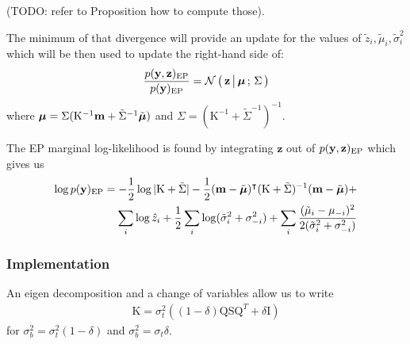  (TODO: refer to Proposition how to compute those).


The minimum of that divergence will provide an update for the values
of $\tilde z_i, \tilde\mu_i, \tilde\sigma^2_i$ which will be then used to update
the right-hand side of:
\begin{align*}
\frac{p(\mathbf y, \mathbf z)_{\text{EP}}}{p(\mathbf y)_{\text{EP}}} = \mathcal{N}\left(\, { {\mathbf z} \, \big| \, {\boldsymbol\mu} } \,;\, { {\Sigma} } \,\right)
\end{align*}
where $\boldsymbol\mu = \Sigma(\mathrm K^{-1} \mathbf m + \tilde\Sigma^{-1}\tilde{\boldsymbol\mu})$
and $\Sigma=(\mathrm K^{-1} + \tilde\Sigma^{-1})^{-1}$.

The EP marginal log-likelihood is found by integrating $\mathbf z$ out of $p(\mathbf y, \mathbf z)_{\text{EP}}$ which gives us
\begin{align*}
\log p(\mathbf y)_{\text{EP}} = -\frac{1}{2} \log |\mathrm K + \tilde \Sigma| - \frac{1}{2} (\mathbf m - \tilde{\boldsymbol\mu})^\intercal(\mathrm K + \tilde\Sigma)^{-1}(\mathbf m - \tilde{\boldsymbol\mu}) +\\
\sum_i \log \hat z_i + \frac{1}{2} \sum_i \log(\tilde \sigma_i^2 + \sigma_{-i}^2) + \sum_i \frac{(\tilde \mu_i - \mu_{-i})^2}{2(\tilde \sigma_i^2 + \sigma_{-i}^2)}
\end{align*}

\subsubsection{Implementation}

An eigen decomposition and a change of variables allow us to write
\begin{align*}
\mathrm K = \sigma_t^2  ((1-\delta)\mathrm Q \mathrm S \mathrm Q^{T} + \delta \mathrm I)
\end{align*}
for $\sigma_b^2=\sigma_t^2(1-\delta)$ and $\sigma_b^2 = \sigma_t \delta$.

